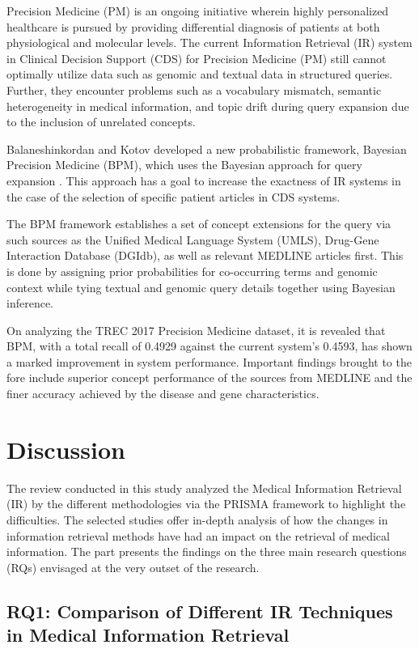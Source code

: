 \documentclass[conference]{IEEEtran}
\begin{document}
Precision Medicine (PM) \cite{Collins2015} is an ongoing initiative wherein highly personalized healthcare is pursued by providing differential diagnosis of patients at both physiological and molecular levels. The current Information Retrieval (IR) system in Clinical Decision Support (CDS) for Precision Medicine (PM) still cannot optimally utilize data such as genomic and textual data in structured queries. Further, they encounter problems such as a vocabulary mismatch, semantic heterogeneity in medical information, and topic drift during query expansion due to the inclusion of unrelated concepts.

Balaneshinkordan and Kotov developed a new probabilistic framework, Bayesian Precision Medicine (BPM), which uses the Bayesian approach for query expansion \cite{Balaneshinkordan2019}. This approach has a goal to increase the exactness of IR systems in the case of the selection of specific patient articles in CDS systems.

The BPM framework establishes a set of concept extensions for the query via such sources as the Unified Medical Language System (UMLS), Drug-Gene Interaction Database (DGIdb), as well as relevant MEDLINE articles first. This is done by assigning prior probabilities for co-occurring terms and genomic context while tying textual and genomic query details together using Bayesian inference.

On analyzing the TREC 2017 Precision Medicine dataset, it is revealed that BPM, with a total recall of 0.4929 against the current system's 0.4593, has shown a marked improvement in system performance. Important findings brought to the fore include superior concept performance of the sources from MEDLINE and the finer accuracy achieved by the disease and gene characteristics.

\section{Discussion}

The review conducted in this study analyzed the Medical Information Retrieval (IR) by the different methodologies via the PRISMA framework to highlight the difficulties. The selected studies offer in-depth analysis of how the changes in information retrieval methods have had an impact on the retrieval of medical information. The part presents the findings on the three main research questions (RQs) envisaged at the very outset of the research.

\subsection{RQ1: Comparison of Different IR Techniques in Medical Information Retrieval}
\end{document}
